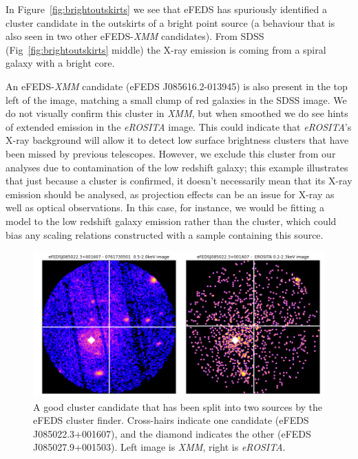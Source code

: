 \documentclass[fleqn,usenatbib]{mnras}
\begin{document}
In Figure~\ref{fig:brightoutskirts} we see that eFEDS has spuriously identified a cluster candidate in the outskirts of a bright point source (a behaviour that is also seen in two other eFEDS-{\em XMM} candidates).  From SDSS (Fig~\ref{fig:brightoutskirts} middle) the X-ray emission is coming from a spiral galaxy with a bright core. 

An eFEDS-{\em XMM} candidate (eFEDS J085616.2-013945) is also present in the top left of the image, matching a small clump of red galaxies in the SDSS image. We do not visually confirm this cluster in {\em XMM}, but when smoothed we do see hints of extended emission in the {\em eROSITA} image. This could indicate that {\em eROSITA}'s X-ray background will allow it to detect low surface brightness clusters that have been missed by previous telescopes.  However, we exclude this cluster from our analyses due to contamination of the low redshift galaxy; this example illustrates that just because a cluster is confirmed, it doesn't necessarily mean that its X-ray emission should be analysed, as projection effects can be an issue for X-ray as well as optical observations. In this case, for instance, we would be fitting a model to the low redshift galaxy emission rather than the cluster, which could bias any scaling relations constructed with a sample containing this source.

\begin{figure}
    \centering
    \includegraphics[width=1\columnwidth]{images/split_cluster.png}
    \caption[]{A good cluster candidate that has been split into two sources by the eFEDS cluster finder. Cross-hairs indicate one candidate (eFEDS J085022.3+001607), and the diamond indicates the other (eFEDS J085027.9+001503). Left image is {\em XMM}, right is {\em eROSITA}.}
    \label{fig:splitcluster}
\end{figure}
\end{document}
